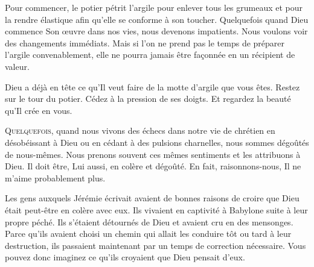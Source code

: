
Pour commencer, le potier pétrit l'argile pour enlever tous les grumeaux
 et pour la rendre élastique afin qu'elle se conforme à son toucher.
 Quelquefois quand Dieu commence Son œuvre dans nos vies,
 nous devenons impatients. Nous voulons voir des changements immédiats.
 Mais si l'on ne prend pas le temps de préparer l'argile convenablement,
 elle ne pourra jamais être façonnée en un récipient de valeur. 

Dieu a déjà en tête ce qu'Il veut faire de la motte d'argile que vous êtes.
 Restez sur le tour du potier. Cédez à la pression de ses doigts.
 Et regardez la beauté qu'Il crée en vous. 

\dvrule







\lettrine{Q}{uelquefois,} quand nous vivons des échecs
 dans notre vie de chrétien en désobéissant à Dieu ou en cédant
 à des pulsions charnelles, nous sommes dégoûtés de nous-mêmes.
 Nous prenons souvent ces mêmes sentiments et les attribuons à Dieu.
 \og Il doit être, Lui aussi, en colère et dégoûté.
 En fait, 
 raisonnons-nous, 
 Il ne m'aime probablement plus. \fg{}


Les gens auxquels Jérémie écrivait avaient de bonnes raisons de croire
 que Dieu était peut-être en colère avec eux. Ils vivaient en captivité
 à Babylone suite à leur propre péché. Ils s'étaient détournés de Dieu
 et avaient cru en des mensonges. Parce qu'ils avaient choisi un chemin
 qui allait les conduire tôt ou tard à leur destruction,
 ils passaient maintenant par un temps de correction nécessaire.
 Vous pouvez donc imaginez ce qu'ils croyaient que Dieu pensait d'eux. 

